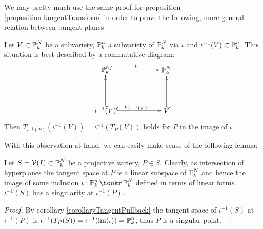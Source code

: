 We may pretty much use the same proof for proposition \ref{propositionTangentTransform} in order to prove the following, more general relation between tangent planes
\begin{corollary} \label{corollaryTangentPullback}
Let $V\subset \operatorname{\mathbb P}^N_k$ be a subvariety, $\operatorname{\mathbb P}^n_k$ a subvariety of $\operatorname{\mathbb P}^N_k$ via $\iota$ and $\iota^{-1}(V) \subset \operatorname{\mathbb P}^n_k$. This situation is best described by a commutative diagram:
\begin{equation}
\begin{xy}
(0,20)*+{\proj^n_k}="pn";
(30,20)*+{\proj^N_k}="pN";
(0,0)*+{\iota^{-1}(V)}="iv";
(30,0)*+{V}="v";
{\ar@{^{(}->} "pn";"pN"}?*!/_2mm/{\iota};
{\ar@{^{(}->} "iv";"v"}?*!/_2mm/{\iota|_{\iota^{-1}(V)}};
{\ar@{_{(}->} "iv";"pn"};
{\ar@{_{(}->} "v";"pN"};
\end{xy}
\end{equation}
Then $T_{\iota^{-1}(P)}(\iota^{-1}(V)) = \iota^{-1}(T_P(V)) $ holds for $P$ in the image of $\iota$.
\end{corollary}

With this observation at hand, we can easily make sense of the following lemma:

\begin{lemma} \label{lemmaIntersectionWithTangent}
Let $S = \operatorname{\mathcal V}(I) \subset \operatorname{\mathbb P}^N_k$ be a projective variety, $P\in S$.
Clearly, as intersection of hyperplanes the tangent space at $P$ is a linear subspace of $\operatorname{\mathbb P}^N_k$ and hence the image of some inclusion $\iota : \proj^n_k \hookr \proj^N_k$ defined in terms of linear forms.
$\iota^{-1}(S)$ has a singularity at $\iota^{-1}(P)$.
\end{lemma}
\begin{proof}
By corollary \ref{corollaryTangentPullback} the tangent space of $\iota^{-1}(S)$ at $\iota^{-1}(P)$ is $\iota^{-1}(T_P(S)) = \iota^{-1}({\operatorname{im}}(\iota)) = \operatorname{\mathbb P}^n_k$, thus $P$ is a singular point.
\end{proof}
